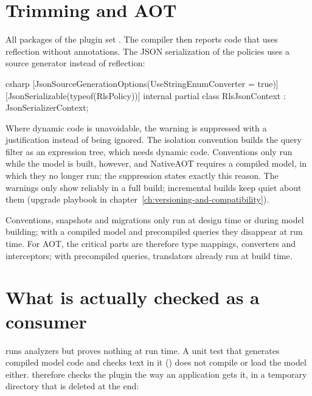 \section{Trimming and AOT}

All packages of the plugin set
.
The compiler then reports code that uses reflection without annotations. The JSON
serialization of the policies uses a source generator instead of reflection:

\begin{sourcecode}{csharp}
[JsonSourceGenerationOptions(UseStringEnumConverter = true)]
[JsonSerializable(typeof(RlsPolicy))]
internal partial class RlsJsonContext : JsonSerializerContext;
\end{sourcecode}

Where dynamic code is unavoidable, the warning is suppressed with a justification instead of
being ignored. The isolation convention builds the query filter as an expression tree, which
needs dynamic code. Conventions only run while the model is built, however, and NativeAOT
requires a compiled model, in which they no longer run; the suppression states exactly this
reason. The warnings only show reliably in a full build; incremental builds keep quiet about
them (upgrade playbook in chapter~\ref{ch:versioning-and-compatibility}).

\begin{note}
  Conventions, snapshots and migrations only run at design time or during model building;
  with a compiled model and precompiled queries they disappear at run time. For AOT, the
  critical parts are therefore type mappings, converters and interceptors; with precompiled
  queries, translators already run at build time.
\end{note}

\section{What is actually checked as a consumer}\label{sec:consumer-test}

 runs analyzers but proves nothing at run time.
A unit test that generates compiled model code and checks text in it
() does not compile or load the model either.
 therefore
checks the plugin the way an application gets it, in a temporary directory that is deleted at
the end:

